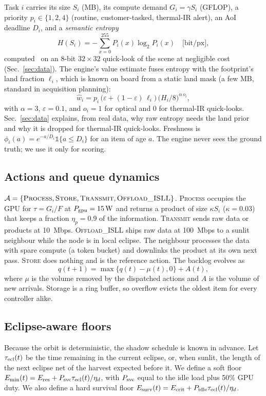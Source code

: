 \documentclass[conference]{IEEEtran}
\theoremstyle{remark}
\begin{document}
Task $i$ carries its size $S_i$ (MB), its compute demand $G_i=\gamma S_i$ (GFLOP), a priority $p_i\in\{1,2,4\}$ (routine, customer-tasked, thermal-IR alert), an AoI deadline $D_i$, and a \emph{semantic entropy}
\begin{equation}
H(S_i)=-\sum_{x=0}^{255}P_i(x)\log_2P_i(x)\quad\text{[bit/px]},
\end{equation}
computed~\cite{shannon1948} on an 8-bit $32\times32$ quick-look of the scene at negligible cost (Sec.~\ref{sec:data}). The engine's value estimate fuses entropy with the footprint's land fraction $\ell_i$, which is known on board from a static land mask (a few MB, standard in acquisition planning):
\begin{equation}
\hat w_i=p_i\,\big(\varepsilon+(1-\varepsilon)\,\ell_i\big)\,\big(H_i/8\big)^{\alpha\,o_i},\label{eq:west}
\end{equation}
with $\alpha=3$, $\varepsilon=0.1$, and $o_i=1$ for optical and $0$ for thermal-IR quick-looks. Sec.~\ref{sec:data} explains, from real data, why raw entropy needs the land prior and why it is dropped for thermal-IR quick-looks. Freshness is $\phi_i(a)=e^{-a/D_i}\mathbb 1\{a\le D_i\}$ for an item of age $a$. The engine never sees the ground truth; we use it only for scoring.

\subsection{Actions and queue dynamics}
$\mathcal A=\{\textsc{Process},\textsc{Store},\textsc{Transmit},\textsc{Offload\_ISLL}\}$. \textsc{Process} occupies the GPU for $\tau=G_i/F$ at $P_{\rm gpu}=\SI{15}{W}$ and returns a product of size $\kappa S_i$ ($\kappa=0.03$) that keeps a fraction $\eta_p=0.9$ of the information. \textsc{Transmit} sends raw data or products at \SI{10}{Mbps}. \textsc{Offload\_ISLL} ships raw data at \SI{100}{Mbps} to a sunlit neighbour while the node is in local eclipse. The neighbour processes the data with spare compute (a token bucket) and downlinks the product at its own next pass. \textsc{Store} does nothing and is the reference action. The backlog evolves as
\begin{equation}
q(t+1)=\max\{q(t)-\mu(t),0\}+A(t),
\end{equation}
where $\mu$ is the volume removed by the dispatched actions and $A$ is the volume of new arrivals. Storage is a ring buffer, so overflow evicts the oldest item for every controller alike.

\subsection{Eclipse-aware floors}
Because the orbit is deterministic, the shadow schedule is known in advance. Let $\tau_{\rm ecl}(t)$ be the time remaining in the current eclipse, or, when sunlit, the length of the next eclipse net of the harvest expected before it. We define a soft floor $E_{\min}(t)=E_{\rm res}+P_{\rm svc}\tau_{\rm ecl}(t)/\eta_d$, with $P_{\rm svc}$ equal to the idle load plus 50\% GPU duty. We also define a hard survival floor $E_{\rm surv}(t)=E_{\rm crit}+P_{\rm idle}\tau_{\rm ecl}(t)/\eta_d$.
\end{document}
